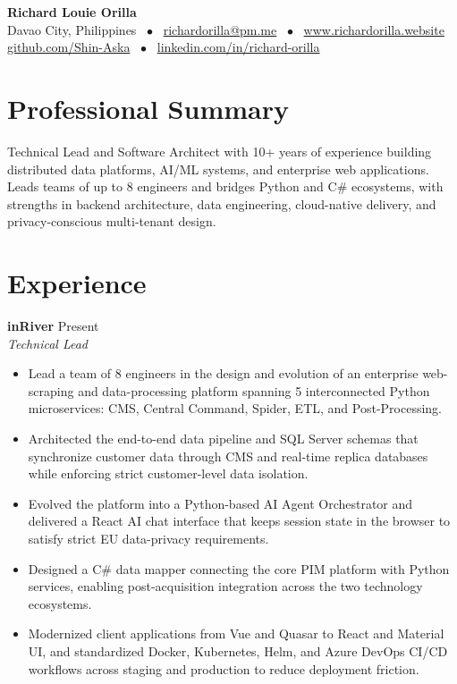 \documentclass[11pt,letterpaper]{article}
\begin{document}
\pagestyle{empty}

\begin{center}
    {\LARGE \bfseries Richard Louie Orilla} \\
    \vspace{4pt}
    Davao City, Philippines \ $\bullet$ \ \href{mailto:richardorilla@pm.me}{richardorilla@pm.me} \ $\bullet$ \ \href{http://www.richardorilla.website}{www.richardorilla.website} \\
    \href{https://github.com/Shin-Aska}{github.com/Shin-Aska} \ $\bullet$ \ \href{https://www.linkedin.com/in/richard-orilla/}{linkedin.com/in/richard-orilla}
\end{center}

\vspace{6pt}

\section{Professional Summary}
\noindent
Technical Lead and Software Architect with 10+ years of experience building distributed data platforms, AI/ML systems, and enterprise web applications. Leads teams of up to 8 engineers and bridges Python and C\# ecosystems, with strengths in backend architecture, data engineering, cloud-native delivery, and privacy-conscious multi-tenant design.

\section{Experience}

\noindent
\textbf{inRiver} \hfill Present \\
\textit{Technical Lead}
\begin{itemize}
    \item Lead a team of 8 engineers in the design and evolution of an enterprise web-scraping and data-processing platform spanning 5 interconnected Python microservices: CMS, Central Command, Spider, ETL, and Post-Processing.
    \item Architected the end-to-end data pipeline and SQL Server schemas that synchronize customer data through CMS and real-time replica databases while enforcing strict customer-level data isolation.
    \item Evolved the platform into a Python-based AI Agent Orchestrator and delivered a React AI chat interface that keeps session state in the browser to satisfy strict EU data-privacy requirements.
    \item Designed a C\# data mapper connecting the core PIM platform with Python services, enabling post-acquisition integration across the two technology ecosystems.
    \item Modernized client applications from Vue and Quasar to React and Material UI, and standardized Docker, Kubernetes, Helm, and Azure DevOps CI/CD workflows across staging and production to reduce deployment friction.
\end{itemize}
\end{document}
